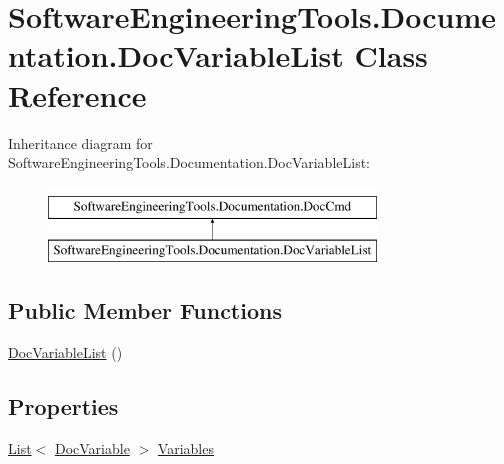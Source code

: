 \hypertarget{class_software_engineering_tools_1_1_documentation_1_1_doc_variable_list}{\section{Software\+Engineering\+Tools.\+Documentation.\+Doc\+Variable\+List Class Reference}
\label{class_software_engineering_tools_1_1_documentation_1_1_doc_variable_list}
}
Inheritance diagram for Software\+Engineering\+Tools.\+Documentation.\+Doc\+Variable\+List\+:\begin{figure}[H]
\begin{center}
\leavevmode
\includegraphics[height=2.000000cm]{class_software_engineering_tools_1_1_documentation_1_1_doc_variable_list}
\end{center}
\end{figure}
\subsection*{Public Member Functions}
\begin{DoxyCompactItemize}
\item 
\hyperlink{class_software_engineering_tools_1_1_documentation_1_1_doc_variable_list_a32c4a8be02e31c5f6cff125e80632d31}{Doc\+Variable\+List} ()
\end{DoxyCompactItemize}
\subsection*{Properties}
\begin{DoxyCompactItemize}
\item 
\hyperlink{namespace_software_engineering_tools_1_1_documentation_ae0bccf4f49a76db084c1c316e5954ec9a4ee29ca12c7d126654bd0e5275de6135}{List}$<$ \hyperlink{class_software_engineering_tools_1_1_documentation_1_1_doc_variable}{Doc\+Variable} $>$ \hyperlink{class_software_engineering_tools_1_1_documentation_1_1_doc_variable_list_ab46ea15f19c87b8ce4bffd1daa3b057e}{Variables}
\end{DoxyCompactItemize}


